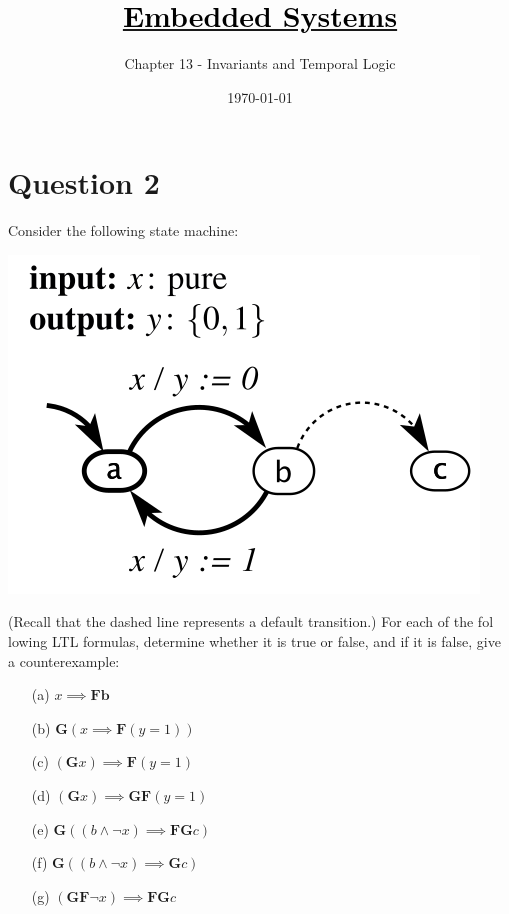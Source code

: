 \documentclass[12pt]{article}
\title{\href{https://github.com/M-Sc-AUT/M.Sc-Computer-Architecture/tree/main/Embedded Systems Modeling and Design}{\textcolor{black}{Embedded Systems}}}
\subtitle{Chapter 13 - Invariants and Temporal Logic}
\date{\today}
\begin{document}
\maketitlepage
\maketitlestart







\section{Question 2}
Consider the following state machine:

\begin{center}
	\includegraphics*[width=0.4\linewidth]{images/img1}
\end{center}

(Recall that the dashed line represents a default transition.) For each of the fol
lowing LTL formulas, determine whether it is true or false, and if it is false, give a
counterexample:

\begin{enumerate}
	\item[(a)] \(x \implies \mathbf{Fb}\)
	\item[(b)] \(\mathbf{G}(x \implies \mathbf{F}(y = 1))\)
	\item[(c)] \((\mathbf{G}x) \implies \mathbf{F}(y = 1)\)
	\item[(d)] \((\mathbf{G}x) \implies \mathbf{GF}(y = 1)\)
	\item[(e)] \(\mathbf{G}((b \land \neg x) \implies \mathbf{FG}c)\)
	\item[(f)] \(\mathbf{G}((b \land \neg x) \implies \mathbf{G}c)\)
	\item[(g)] \((\mathbf{GF}\neg x) \implies \mathbf{FG}c\)
\end{enumerate}
\end{document}

